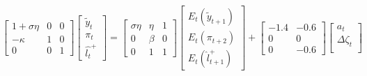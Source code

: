 \documentclass[12pt]{article}
\begin{document}
\begin{equation}
\left[
\begin{array}{ccc}
 1+\sigma\eta & 0  & 0  \\
  -\kappa& 1  & 0   \\
  0 & 0  &  1  
\end{array}
\right]
\left[
\begin{array}{c}
\tilde{y}_{t}\\
\pi_{t}\\
\hat{l_{t}}^{+}
\end{array}
\right]=
\left[
\begin{array}{ccc}
 \sigma\eta & \eta  & 1  \\
  0& \beta  & 0   \\
  0 & 1  &  1  
\end{array}
\right]
\left[
\begin{array}{c}
E_{t}(\tilde{y}_{t+1})\\
E_{t}(\pi_{t+2})\\
E_{t}(\hat{l}_{t+1}^{+})
\end{array}
\right]
+ 
\left[
\begin{array}{cc}
 -1.4 & -0.6 \\
  0 & 0   \\
  0 & -0.6
\end{array}
\right]
\left[
\begin{array}{ccc}
 a_t    \\
   \Delta\zeta_{t} \\  
\end{array}
\right]
\end{equation}
\end{document}
